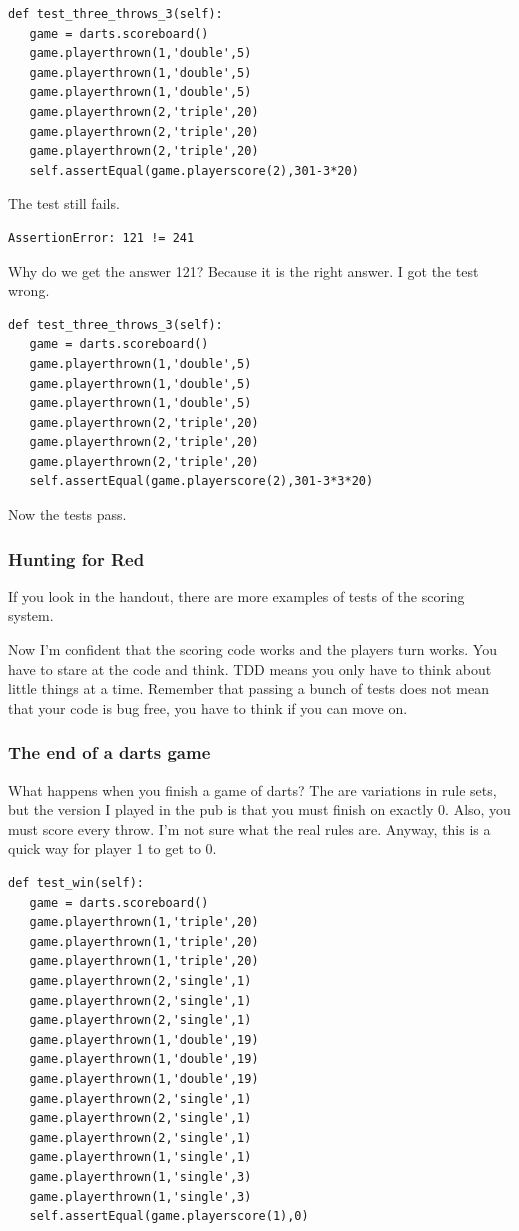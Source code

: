 \documentclass{beamer}
\begin{document}
\begin{frame}[fragile]
\begin{lstlisting}
def test_three_throws_3(self):
   game = darts.scoreboard()
   game.playerthrown(1,'double',5)
   game.playerthrown(1,'double',5)
   game.playerthrown(1,'double',5)
   game.playerthrown(2,'triple',20)
   game.playerthrown(2,'triple',20)
   game.playerthrown(2,'triple',20)
   self.assertEqual(game.playerscore(2),301-3*20)
\end{lstlisting}
The test still fails.
\begin{verbatim}
AssertionError: 121 != 241
\end{verbatim}
\end{frame}
\begin{frame}[fragile]
Why do we get the answer 121? Because it is the right answer. I got
the test wrong.
\begin{lstlisting}
def test_three_throws_3(self):
   game = darts.scoreboard()
   game.playerthrown(1,'double',5)
   game.playerthrown(1,'double',5)
   game.playerthrown(1,'double',5)
   game.playerthrown(2,'triple',20)
   game.playerthrown(2,'triple',20)
   game.playerthrown(2,'triple',20)
   self.assertEqual(game.playerscore(2),301-3*3*20)
\end{lstlisting}
Now the tests pass.  
\end{frame}
\begin{frame}
\frametitle{Hunting for Red}
If you look in the handout, there are more examples of tests of the
scoring system.

Now I'm confident that the scoring code works and the players turn
works. You have to stare at the code and think. \newline TDD means you only
have to think about little things at a time. \newline Remember that passing a
bunch of tests does not mean that your code is bug free, you have to
think if you can move on.
  
\end{frame}
\begin{frame}
\frametitle{The end of a darts game}
What happens when you finish a game of darts? The are variations in
rule sets, but the version I played in the pub is that you must finish
on exactly 0.  Also, you must score every throw. I'm not sure what the
real rules are. Anyway, this is a quick way for player 1 to get to 0.
\end{frame}
\begin{frame}[fragile]
\begin{lstlisting}
def test_win(self):
   game = darts.scoreboard()
   game.playerthrown(1,'triple',20)
   game.playerthrown(1,'triple',20)
   game.playerthrown(1,'triple',20)
   game.playerthrown(2,'single',1)
   game.playerthrown(2,'single',1)
   game.playerthrown(2,'single',1)
   game.playerthrown(1,'double',19)
   game.playerthrown(1,'double',19)
   game.playerthrown(1,'double',19)
   game.playerthrown(2,'single',1)
   game.playerthrown(2,'single',1)
   game.playerthrown(2,'single',1)
   game.playerthrown(1,'single',1)
   game.playerthrown(1,'single',3)
   game.playerthrown(1,'single',3)
   self.assertEqual(game.playerscore(1),0)  
\end{lstlisting}
\end{frame}
\end{document}
